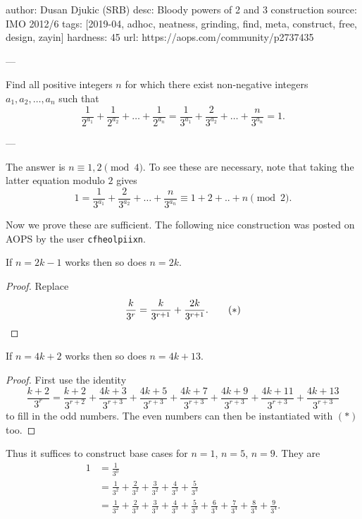 author: Dusan Djukic (SRB)
desc: Bloody powers of 2 and 3 construction
source: IMO 2012/6
tags: [2019-04, adhoc, neatness, grinding, find, meta, construct, free, design, zayin]
hardness: 45
url: https://aops.com/community/p2737435

---

Find all positive integers $n$
for which there exist non-negative integers $a_1, a_2, \dots, a_n$
such that
\[ \frac{1}{2^{a_1}} + \frac{1}{2^{a_2}} + \dots + \frac{1}{2^{a_n}}
  = \frac{1}{3^{a_1}} + \frac{2}{3^{a_2}} + \dots + \frac{n}{3^{a_n}}
  = 1. \]

---

The answer is $n \equiv 1, 2 \pmod 4$.
To see these are necessary,
note that taking the latter equation modulo $2$ gives
\[ 1 = \frac{1}{3^{a_1}} + \frac{2}{3^{a_2}} + \dots + \frac{n}{3^{a_n}}
\equiv 1 + 2 + .. + n \pmod 2. \]

Now we prove these are sufficient.
The following nice construction was posted on AOPS
by the user \texttt{cfheolpiixn}.

\begin{claim*}
  If $n = 2k-1$ works then so does $n = 2k$.
\end{claim*}
\begin{proof}
  Replace
  \[ \frac{k}{3^r} = \frac{k}{3^{r+1}} + \frac{2k}{3^{r+1}}.
    \qquad(\ast) \qedhere \]
\end{proof}

\begin{claim*}
  If $n = 4k+2$ works then so does $n = 4k + 13$.
\end{claim*}
\begin{proof}
  First use the identity
  \[
    \frac{k+2}{3^r} = \frac{k+2}{3^{r+2}}
    + \frac{4k+ 3}{3^{r+3}}
    + \frac{4k+ 5}{3^{r+3}}
    + \frac{4k+ 7}{3^{r+3}}
    + \frac{4k+ 9}{3^{r+3}}
    + \frac{4k+11}{3^{r+3}}
    + \frac{4k+13}{3^{r+3}}
  \]
  to fill in the odd numbers.
  The even numbers can then be instantiated with $(\ast)$ too.
\end{proof}

Thus it suffices to construct base cases
for $n = 1$, $n = 5$, $n = 9$.
They are
\begin{align*}
  1 &= \frac{1}{3^0} \\
  &= \frac{1}{3^2} + \frac{2}{3^2} + \frac{3}{3^2}
    + \frac{4}{3^3} + \frac{5}{3^3} \\
  &= \frac{1}{3^2} + \frac{2}{3^3} + \frac{3}{3^3}
  + \frac{4}{3^3} + \frac{5}{3^3} + \frac{6}{3^4}
  + \frac{7}{3^4} + \frac{8}{3^4} + \frac{9}{3^4}.
\end{align*}
